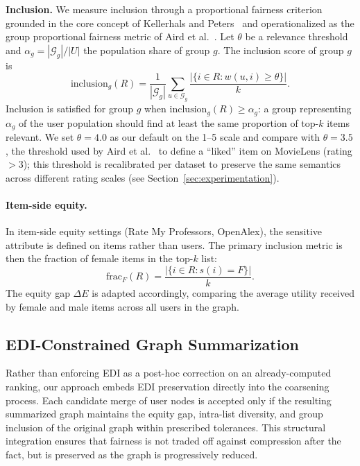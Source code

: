 \documentclass[a4paper,fleqn]{cas-dc}
\begin{document}
\smallskip\noindent\textbf{Inclusion.}
We measure inclusion through a proportional fairness criterion grounded in the
core concept of Kellerhals and Peters~\citeyearpar{kellerhals_proportional_2024} and
operationalized as the group proportional fairness metric of Aird et
al.~\citeyearpar{aird_social_2024}. Let $\theta$ be a relevance threshold and
$\alpha_g = |\mathcal{G}_g|/|U|$ the population share of group $g$. The
inclusion score of group $g$ is
\begin{equation}
  \mathrm{inclusion}_g(R)
    = \frac{1}{|\mathcal{G}_g|}
      \sum_{u \in \mathcal{G}_g}
      \frac{|\{i \in R : w(u,i) \geq \theta\}|}{k}.
\end{equation}
Inclusion is satisfied for group $g$ when $\mathrm{inclusion}_g(R) \geq
\alpha_g$: a group representing $\alpha_g$ of the user population should find
at least the same proportion of top-$k$ items relevant. We set $\theta = 4.0$
as our default on the 1--5 scale and compare with $\theta = 3.5$, the
threshold used by Aird et al.~\citeyearpar{aird_social_2024} to define a ``liked''
item on MovieLens (rating $>3$); this threshold is recalibrated per dataset
to preserve the same semantics across different rating scales (see
Section~\ref{sec:experimentation}).

\paragraph{Item-side equity.}
In item-side equity settings (Rate My Professors, OpenAlex), the sensitive
attribute is defined on items rather than users. The primary inclusion metric
is then the fraction of female items in the top-$k$ list:
\[
  \mathrm{frac}_F(R) = \frac{|\{i \in R : s(i) = F\}|}{k}.
\]
The equity gap $\Delta E$ is adapted accordingly, comparing the average
utility received by female and male items across all users in the graph.


\subsection{EDI-Constrained Graph Summarization}
Rather than enforcing EDI as a post-hoc correction on an already-computed
ranking, our approach embeds EDI preservation directly into the coarsening
process. Each candidate merge of user nodes is accepted only if the resulting
summarized graph maintains the equity gap, intra-list diversity, and group
inclusion of the original graph within prescribed tolerances. This structural
integration ensures that fairness is not traded off against compression after
the fact, but is preserved as the graph is progressively reduced.
\end{document}
